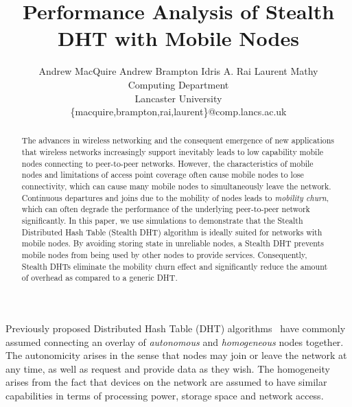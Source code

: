 \documentclass[times, 10pt,twocolumn]{article}
\begin{document}
\title{Performance Analysis of Stealth DHT with Mobile Nodes}

\author{Andrew MacQuire \quad Andrew Brampton \quad Idris A. Rai \quad Laurent Mathy\\
Computing Department\\Lancaster University\\
\{macquire,brampton,rai,laurent\}@comp.lancs.ac.uk}

\maketitle \thispagestyle{empty}

\begin{abstract}
The advances in wireless networking and the consequent emergence of
new applications that wireless networks increasingly support
inevitably leads to low capability mobile nodes connecting to
peer-to-peer networks.  However, the characteristics of mobile nodes
and limitations of access point coverage often cause mobile nodes to
lose connectivity, which can cause many mobile nodes to
simultaneously leave the network. Continuous departures and joins
due to the mobility of nodes leads to {\em mobility churn}, which
can often degrade the performance of the underlying peer-to-peer
network significantly. In this paper, we use simulations to
demonstrate that the Stealth Distributed Hash Table (Stealth DHT)
algorithm is ideally suited for networks with mobile nodes. By
avoiding storing state in unreliable nodes, a Stealth DHT prevents
mobile nodes from being used by other nodes to provide services.
Consequently, Stealth DHTs eliminate the mobility churn effect and
significantly reduce the amount of overhead as compared to a generic
DHT.
\end{abstract}

 \label{sect-intro}

Previously proposed Distributed Hash Table (DHT)
algorithms~\cite{can01}\cite{pastry01}\cite{chord01} have commonly
assumed connecting an overlay of {\em autonomous} and {\em
homogeneous} nodes together. The autonomicity arises in the sense
that nodes may join or leave the network at any time, as well as
request and provide data as they wish. The homogeneity arises from the
fact that devices on the network are assumed to have similar
capabilities in terms of processing power, storage space and network
access.

\end{document}
